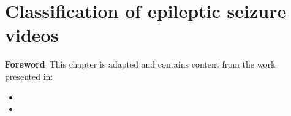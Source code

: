 \chapter[Classification of epileptic seizure videos]{Classification of epileptic seizure videos}

\label{chap:videos}
\minitoc

\begin{center}
  \begin{minipage}[b]{0.9\linewidth}
    \small
    \textbf{Foreword\,}
    This chapter is adapted and contains content from the work presented in:
    \begin{itemize}
      \item {}
      \item {}
    \end{itemize}
  \end{minipage}
\end{center}



\acresetall
\bodyspacing





\onehalfspacing %
